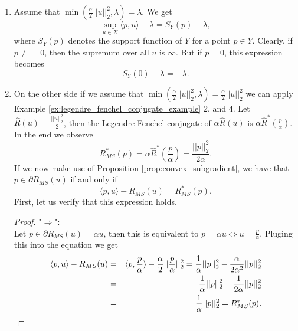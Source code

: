             \begin{enumerate}
                \item Assume that $\min(\frac{\alpha}{2} ||u||_{2}^{2}, \lambda) = \lambda$. We get
                    $$
                        \sup_{u \in X} \langle p, u \rangle - \lambda = S_{Y}(p) - \lambda,
                    $$
                where $S_{Y}(p)$ denotes the support function of $Y$ for a point $p \in Y$. Clearly, if $p \neq = 0$, then the supremum over all $u$ is $\infty$. But if $p = 0$, this expression becomes
                    $$
                        S_{Y}(0) - \lambda = - \lambda.
                    $$
                \item On the other side if we assume that $\min(\frac{\alpha}{2} ||u||_{2}^{2}, \lambda) = \frac{\alpha}{2} ||u||_{2}^{2}$ we can apply Example \ref{ex:legendre_fenchel_conjugate_example} 2. and 4. Let $\hat{R}(u) = \frac{||u||_{2}^{2}}{2}$, then the Legendre-Fenchel conjugate of $\alpha \hat{R}(u)$ is $\alpha \hat{R}^{\ast}(\frac{p}{\alpha})$. In the end we observe
                    \begin{equation}
                        R_{MS}^{\ast}(p) = \alpha \hat{R}^{\ast}(\frac{p}{\alpha}) = \frac{||p||_{2}^{2}}{2\alpha}.
                    \label{eq:mumford_shah_convex_conjugate}
                    \end{equation}
                If we now make use of Proposition \ref{prop:convex_subgradient}, we have that $p \in \partial R_{MS}(u)$ if and only if
                    $$
                        \langle p, u \rangle - R_{MS}(u) = R_{MS}^{\ast}(p).
                    $$
                First, let us verify that this expression holds.
                    \begin{proof}
                        "$\Longrightarrow$":\\
                        Let $p \in \partial R_{MS}(u) = \alpha u$, then this is equivalent to $p = \alpha u \Longleftrightarrow u = \frac{p}{\alpha}$. Pluging this into the equation we get
                            \begin{eqnarray}
                                \langle p, u \rangle - R_{MS}(u) &=& \langle p, \frac{p}{\alpha} \rangle - \frac{\alpha}{2}||\frac{p}{\alpha}||_{2}^{2} = \frac{1}{\alpha} ||p||_{2}^{2} - \frac{\alpha}{2 \alpha^{2}} ||p||_{2}^{2} \notag \\
                                &=& \frac{1}{\alpha} ||p||_{2}^{2} - \frac{1}{2 \alpha} ||p||_{2}^{2} \notag \\
                                &=& \frac{1}{\alpha} ||p||_{2}^{2} = R_{MS}^{\ast}(p).

\end{eqnarray}
\end{proof}
\end{enumerate}
